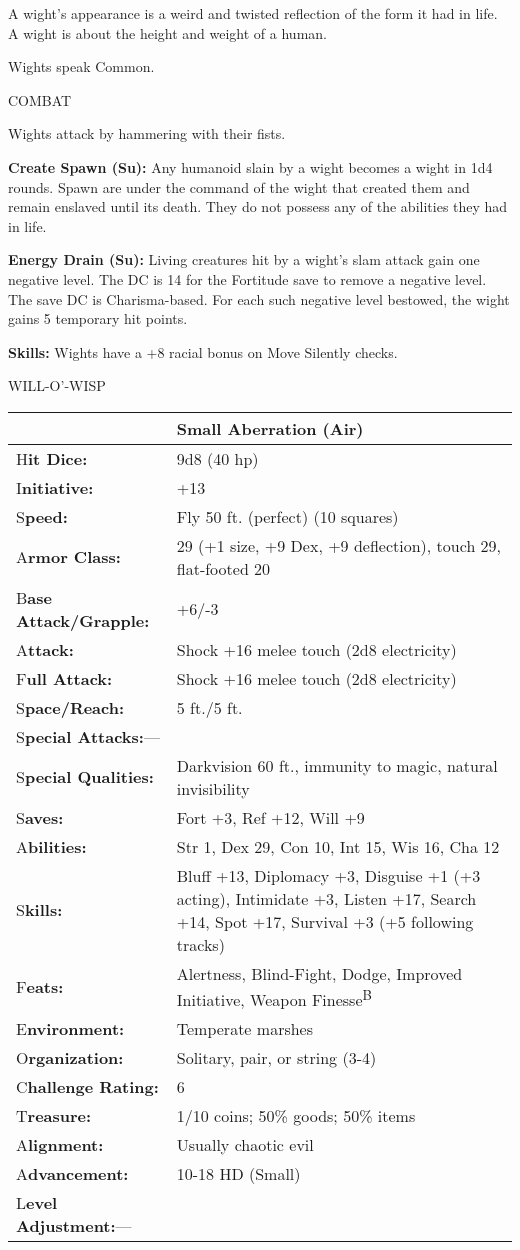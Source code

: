 \documentclass{article}
\begin{document}
A wight's appearance is a weird and twisted reflection of the form it had in life. 
A wight is about the height and weight of a human.

Wights speak Common.

COMBAT

Wights attack by hammering with their fists.

\textbf{Create Spawn (Su):} Any humanoid slain by a wight becomes a wight in 1d4 
rounds. Spawn are under the command of the wight that created them and remain enslaved 
until its death. They do not possess any of the abilities they had in life.

\textbf{Energy Drain (Su): }Living creatures hit by a wight's slam attack gain 
one negative level. The DC is 14 for the Fortitude save to remove a negative level. 
The save DC is Charisma-based. For each such negative level bestowed, the wight 
gains 5 temporary hit points.

\textbf{Skills:} Wights have a +8 racial bonus on Move Silently checks.

\vspace{12pt}
{\LARGE{}WILL-O'-WISP}

\begin{tabular}{|>{\raggedright}p{82pt}|>{\raggedright}p{243pt}|}
\hline
  & Small Aberration (Air)\tabularnewline
\hline
H\textbf{it Dice:} & 9d8 (40 hp)\tabularnewline
\hline
I\textbf{nitiative:} & +13\tabularnewline
\hline
S\textbf{peed:} & Fly 50 ft. (perfect) (10 squares)\tabularnewline
\hline
A\textbf{rmor Class:} & 29 (+1 size, +9 Dex, +9 deflection), touch 29, flat-footed 
20\tabularnewline
\hline
B\textbf{ase Attack/Grapple:} & +6/-3\tabularnewline
\hline
A\textbf{ttack:} & Shock +16 melee touch (2d8 electricity)\tabularnewline
\hline
F\textbf{ull Attack:} & Shock +16 melee touch (2d8 electricity)\tabularnewline
\hline
S\textbf{pace/Reach:} & 5 ft./5 ft.\tabularnewline
\hline
S\textbf{pecial Attacks:}--- & \tabularnewline
\hline
S\textbf{pecial Qualities:} & Darkvision 60 ft., immunity to magic, natural invisibility\tabularnewline
\hline
S\textbf{aves:} & Fort +3, Ref +12, Will +9\tabularnewline
\hline
A\textbf{bilities:} & Str 1, Dex 29, Con 10, Int 15, Wis 16, Cha 12\tabularnewline
\hline
S\textbf{kills:} & Bluff +13, Diplomacy +3, Disguise +1 (+3 acting), Intimidate 
+3, Listen +17, Search +14, Spot +17, Survival +3 (+5 following tracks)\tabularnewline
\hline
F\textbf{eats:} & Alertness, Blind-Fight, Dodge, Improved Initiative, Weapon Finesse\textsuperscript{B}\tabularnewline
\hline
E\textbf{nvironment:} & Temperate marshes\tabularnewline
\hline
O\textbf{rganization:} & Solitary, pair, or string (3-4)\tabularnewline
\hline
C\textbf{hallenge Rating:} & 6\tabularnewline
\hline
T\textbf{reasure:} & 1/10 coins; 50\% goods; 50\% items\tabularnewline
\hline
A\textbf{lignment:} & Usually chaotic evil\tabularnewline
\hline
A\textbf{dvancement:} & 10-18 HD (Small)\tabularnewline
\hline
L\textbf{evel Adjustment:}--- & \tabularnewline
\hline
\end{tabular}
\end{document}
